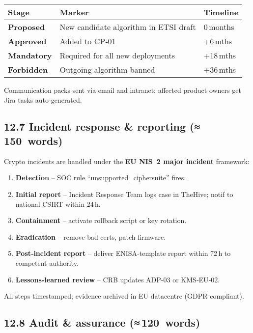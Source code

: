 \documentclass[
  english,
]{article}
\providecommand{\tightlist}{%
  \setlength{\itemsep}{0pt}\setlength{\parskip}{0pt}}
\begin{document}
\begin{longtable}[]{@{}lll@{}}
\toprule\noalign{}
Stage & Marker & Timeline \\
\midrule\noalign{}
\endhead
\bottomrule\noalign{}
\endlastfoot
\textbf{Proposed} & New candidate algorithm in ETSI draft & 0\,months \\
\textbf{Approved} & Added to CP‑01 & +6\,mths \\
\textbf{Mandatory} & Required for all new deployments & +18\,mths \\
\textbf{Forbidden} & Outgoing algorithm banned & +36\,mths \\
\end{longtable}

Communication packs sent via email and intranet; affected product owners
get Jira tasks auto‑generated.

\subsection{12.7 Incident response \& reporting
(≈\,150~words)}\label{incident-response-reporting-150-words}

Crypto incidents are handled under the \textbf{EU NIS~2 major incident}
framework:

\begin{enumerate}
\def\labelenumi{\arabic{enumi}.}
\tightlist
\item
  \textbf{Detection} -- SOC rule ``unsupported\_ciphersuite'' fires.
\item
  \textbf{Initial report} -- Incident Response Team logs case in
  TheHive; notif to national CSIRT within 24\,h.
\item
  \textbf{Containment} -- activate rollback script or key rotation.
\item
  \textbf{Eradication} -- remove bad certs, patch firmware.
\item
  \textbf{Post‑incident report} -- deliver ENISA‑template report within
  72\,h to competent authority.
\item
  \textbf{Lessons‑learned review} -- CRB updates ADP‑03 or KMS‑EU‑02.
\end{enumerate}

All steps timestamped; evidence archived in EU datacentre (GDPR
compliant).

\subsection{12.8 Audit \& assurance
(≈\,120~words)}\label{audit-assurance-120-words}
\end{document}
